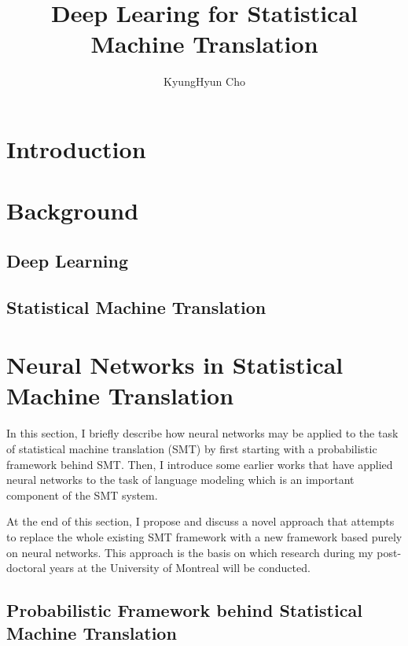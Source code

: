 \documentclass[11pt, oneside]{essay}
\title{Deep Learing for Statistical Machine Translation}
\author{KyungHyun Cho}
\begin{document}
\maketitle

\section{Introduction}





\section{Background}

\subsection{Deep Learning}

\subsection{Statistical Machine Translation}


\section{Neural Networks in Statistical Machine Translation}

In this section, I briefly describe how neural networks may be
applied to the task of statistical machine translation (SMT) by
first starting with a probabilistic framework behind SMT. Then, I
introduce some earlier works that have applied neural networks to
the task of language modeling which is an important component of
the SMT system.

At the end of this section, I propose and discuss a novel
approach that attempts to replace the whole existing SMT
framework with a new framework based purely on neural networks.
This approach is the basis on which research during my
post-doctoral years at the University of Montreal will be
conducted.

\subsection{Probabilistic Framework behind Statistical Machine
Translation}
\end{document}
